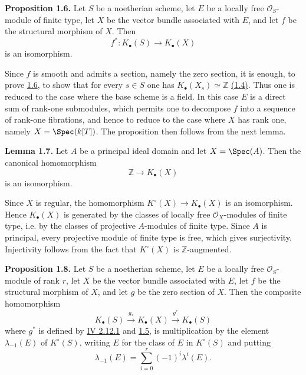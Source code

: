 \textbf{Proposition 1.6.} Let $S$ be a noetherian scheme, let $E$ be a locally free $\mathcal O_S$-module of finite type, let $X$ be the vector bundle associated with $E$, and let $f$ be the structural morphism of $X$. Then
\[
 f^*:K_\bullet(S)\longrightarrow K_\bullet(X)
\]
is an isomorphism.

Since $f$ is smooth and admits a section, namely the zero section, it is enough, to prove \hyperlink{sga6.e09.prop.1-6}{1.6}, to show that for every $s\in S$ one has $K_\bullet(X_s)\simeq \mathbb Z$ \hyperlink{sga6.e09.cor.1-4}{(1.4)}. Thus one is reduced to the case where the base scheme is a field. In this case $E$ is a direct sum of rank-one submodules, which permits one to decompose $f$ into a sequence of rank-one fibrations, and hence to reduce to the case where $X$ has rank one, namely $X=\Spec(k[T])$. The proposition then follows from the next lemma.

\textbf{Lemma 1.7.} Let $A$ be a principal ideal domain and let $X=\Spec(A)$. Then the canonical homomorphism
\[
 \mathbb Z\longrightarrow K_\bullet(X)
\]
is an isomorphism.

Since $X$ is regular, the homomorphism $K^\circ(X)\to K_\bullet(X)$ is an isomorphism. Hence $K_\bullet(X)$ is generated by the classes of locally free $\mathcal O_X$-modules of finite type, i.e. by the classes of projective $A$-modules of finite type. Since $A$ is principal, every projective module of finite type is free, which gives surjectivity. Injectivity follows from the fact that $K^\circ(X)$ is $\mathbb Z$-augmented.

\textbf{Proposition 1.8.} Let $S$ be a noetherian scheme, let $E$ be a locally free $\mathcal O_S$-module of rank $r$, let $X$ be the vector bundle associated with $E$, let $f$ be the structural morphism of $X$, and let $g$ be the zero section of $X$. Then the composite homomorphism
\[
 K_\bullet(S)\xrightarrow{g_*}K_\bullet(X)\xrightarrow{g^*}K_\bullet(S)
\]
where $g^*$ is defined by \hyperlink{sga6.e04.eq.2-12-1}{IV 2.12.1} and \hyperlink{sga6.e04.para.1-5}{1.5}, is multiplication by the element $\lambda_{-1}(E)$ of $K^\circ(S)$, writing $E$ for the class of $E$ in $K^\circ(S)$ and putting
\[
 \lambda_{-1}(E)=\sum_{i=0}^r(-1)^i\lambda^i(E).
\]

